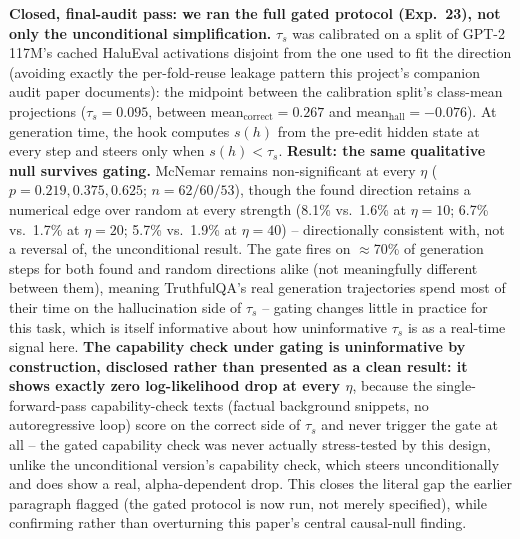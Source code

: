 \documentclass[10pt,twocolumn]{article}
\begin{document}
\textbf{Closed, final-audit pass: we ran the full gated protocol
(Exp.~23), not only the unconditional simplification.} $\tau_s$ was
calibrated on a split of GPT-2 117M's cached HaluEval activations
disjoint from the one used to fit the direction (avoiding exactly the
per-fold-reuse leakage pattern this project's companion audit paper
documents): the midpoint between the calibration split's class-mean
projections ($\tau_s=0.095$, between mean$_{\text{correct}}=0.267$ and
mean$_{\text{hall}}=-0.076$). At generation time, the hook computes
$s(h)$ from the pre-edit hidden state at every step and steers only
when $s(h)<\tau_s$. \textbf{Result: the same qualitative null survives
gating.} McNemar remains non-significant at every $\eta$ ($p=0.219,
0.375, 0.625$; $n=62/60/53$), though the found direction retains a
numerical edge over random at every strength (8.1\% vs.\ 1.6\% at
$\eta=10$; 6.7\% vs.\ 1.7\% at $\eta=20$; 5.7\% vs.\ 1.9\% at
$\eta=40$) -- directionally consistent with, not a reversal of, the
unconditional result. The gate fires on $\approx$70\% of generation
steps for both found and random directions alike (not meaningfully
different between them), meaning TruthfulQA's real generation
trajectories spend most of their time on the hallucination side of
$\tau_s$ -- gating changes little in practice for this task, which is
itself informative about how uninformative $\tau_s$ is as a real-time
signal here. \textbf{The capability check under gating is
uninformative by construction, disclosed rather than presented as a
clean result: it shows exactly zero log-likelihood drop at every
$\eta$}, because the single-forward-pass capability-check texts
(factual background snippets, no autoregressive loop) score on the
correct side of $\tau_s$ and never trigger the gate at all -- the
gated capability check was never actually stress-tested by this
design, unlike the unconditional version's capability check, which
steers unconditionally and does show a real, alpha-dependent drop.
This closes the literal gap the earlier paragraph flagged (the gated
protocol is now run, not merely specified), while confirming rather
than overturning this paper's central causal-null finding.
\end{document}
